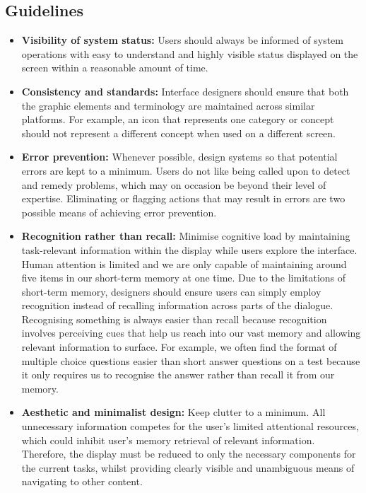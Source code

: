 \subsection{Guidelines}
\begin{itemize}
\item \textbf{Visibility of system status:} Users should always be informed of system operations with easy to understand and highly visible status displayed on the screen within a reasonable amount of time.

\item \textbf{Consistency and standards:} Interface designers should ensure that both the graphic elements and terminology are maintained across similar platforms. For example, an icon that represents one category or concept should not represent a different concept when used on a different screen.

\item \textbf{Error prevention:} Whenever possible, design systems so that potential errors are kept to a minimum. Users do not like being called upon to detect and remedy problems, which may on occasion be beyond their level of expertise. Eliminating or flagging actions that may result in errors are two possible means of achieving error prevention.

\item \textbf{Recognition rather than recall:} Minimise cognitive load by maintaining task-relevant information within the display while users explore the interface. Human attention is limited and we are only capable of maintaining around five items in our short-term memory at one time. Due to the limitations of short-term memory, designers should ensure users can simply employ recognition instead of recalling information across parts of the dialogue. Recognising something is always easier than recall because recognition involves perceiving cues that help us reach into our vast memory and allowing relevant information to surface. For example, we often find the format of multiple choice questions easier than short answer questions on a test because it only requires us to recognise the answer rather than recall it from our memory.

\item \textbf{Aesthetic and minimalist design:} Keep clutter to a minimum. All unnecessary information competes for the user's limited attentional resources, which could inhibit user's memory retrieval of relevant information. Therefore, the display must be reduced to only the necessary components for the current tasks, whilst providing clearly visible and unambiguous means of navigating to other content.

\end{itemize}

